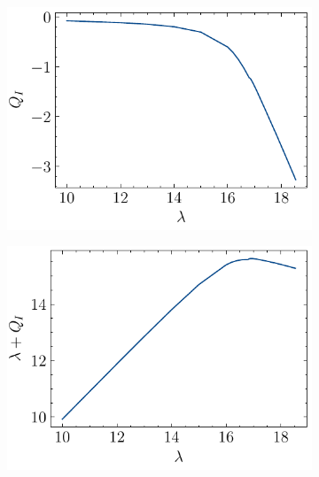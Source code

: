 
\begin{figure}
\begin{subfigure}{0.5\textwidth}
    \centering
    \includegraphics[width=0.95\linewidth]{figures/dirichlet/inducedCharge.pdf}
\end{subfigure}
\begin{subfigure}{0.5\textwidth}
    \centering
    \includegraphics[width=0.95\linewidth]{figures/dirichlet/electricFieldInduced.pdf}

\end{subfigure}
\end{figure}
